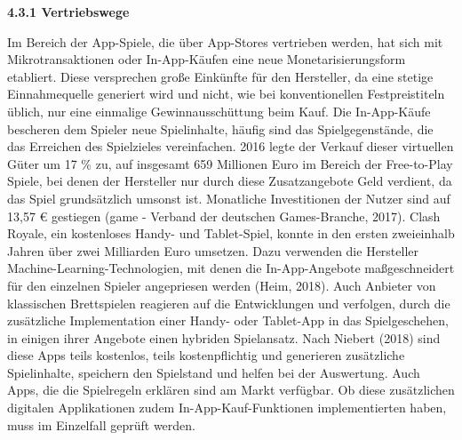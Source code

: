 \documentclass[
  a4paper,
  DIV=11,
  numbers=noendperiod,
  onecolumn,
  oneside,
  a4paper]{scrartcl}
\begin{document}
\textbf{4.3.1 Vertriebswege}

Im Bereich der App-Spiele, die über App-Stores vertrieben werden, hat
sich mit Mikrotransaktionen oder In-App-Käufen eine neue
Monetarisierungsform etabliert. Diese versprechen große Einkünfte für
den Hersteller, da eine stetige Einnahmequelle generiert wird und nicht,
wie bei konventionellen Festpreistiteln üblich, nur eine einmalige
Gewinnausschüttung beim Kauf. Die In-App-Käufe bescheren dem Spieler
neue Spielinhalte, häufig sind das Spielgegenstände, die das Erreichen
des Spielzieles vereinfachen. 2016 legte der Verkauf dieser virtuellen
Güter um 17 \% zu, auf insgesamt 659 Millionen Euro im Bereich der
Free-to-Play Spiele, bei denen der Hersteller nur durch diese
Zusatzangebote Geld verdient, da das Spiel grundsätzlich umsonst ist.
Monatliche Investitionen der Nutzer sind auf 13,57 € gestiegen (game -
Verband der deutschen Games-Branche, 2017). Clash Royale, ein
kostenloses Handy- und Tablet-Spiel, konnte in den ersten zweieinhalb
Jahren über zwei Milliarden Euro umsetzen. Dazu verwenden die Hersteller
Machine-Learning-Technologien, mit denen die In-App-Angebote
maßgeschneidert für den einzelnen Spieler angepriesen werden (Heim,
2018). Auch Anbieter von klassischen Brettspielen reagieren auf die
Entwicklungen und verfolgen, durch die zusätzliche Implementation einer
Handy- oder Tablet-App in das Spielgeschehen, in einigen ihrer Angebote
einen hybriden Spielansatz. Nach Niebert (2018) sind diese Apps teils
kostenlos, teils kostenpflichtig und generieren zusätzliche
Spielinhalte, speichern den Spielstand und helfen bei der Auswertung.
Auch Apps, die die Spielregeln erklären sind am Markt verfügbar. Ob
diese zusätzlichen digitalen Applikationen zudem In-App-Kauf-Funktionen
implementierten haben, muss im Einzelfall geprüft werden.
\end{document}
